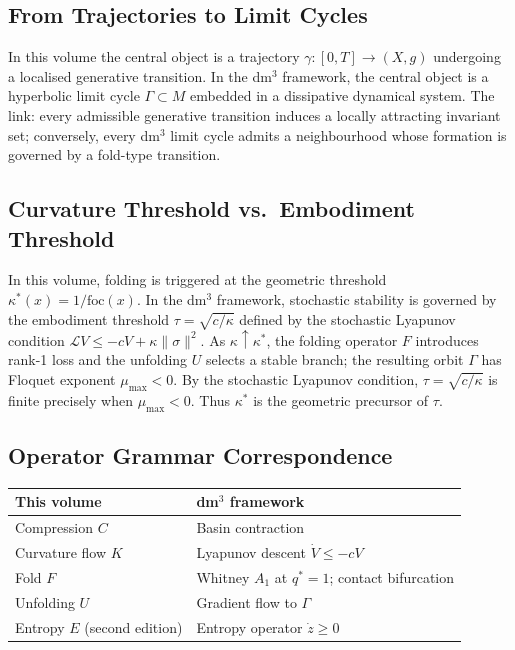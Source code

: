 \documentclass[12pt,a4paper]{article}
\begin{document}
\subsection{From Trajectories to Limit Cycles}

In this volume the central object is a trajectory
$\gamma : [0,T] \to (X,g)$ undergoing a localised generative
transition.
In the dm$^3$ framework, the central object is a hyperbolic limit cycle
$\Gamma \subset M$ embedded in a dissipative dynamical system.
The link: every admissible generative transition induces a locally
attracting invariant set; conversely, every dm$^3$ limit cycle admits
a neighbourhood whose formation is governed by a fold-type transition.

\subsection{Curvature Threshold vs.\ Embodiment Threshold}

In this volume, folding is triggered at the geometric threshold
$\kappa^*(x) = 1/\mathrm{foc}(x)$.
In the dm$^3$ framework, stochastic stability is governed by the
embodiment threshold $\tau = \sqrt{c/\kappa}$ defined by the stochastic
Lyapunov condition $\mathcal{L}V \leq -cV + \kappa\|\sigma\|^2$.
As $\kappa \uparrow \kappa^*$, the folding operator $F$ introduces
rank-1 loss and the unfolding $U$ selects a stable branch; the
resulting orbit $\Gamma$ has Floquet exponent $\mu_{\max} < 0$.
By the stochastic Lyapunov condition, $\tau = \sqrt{c/\kappa}$ is
finite precisely when $\mu_{\max} < 0$.
Thus $\kappa^*$ is the geometric precursor of $\tau$.

\subsection{Operator Grammar Correspondence}

\begin{center}
\small
\begin{tabular}{ll}
\toprule
This volume & dm$^3$ framework \\
\midrule
Compression $C$ & Basin contraction \\
Curvature flow $K$ & Lyapunov descent $\dot{V} \leq -cV$ \\
Fold $F$ & Whitney $A_1$ at $q^* = 1$; contact bifurcation \\
Unfolding $U$ & Gradient flow to $\Gamma$ \\
Entropy $E$ (second edition) & Entropy operator $\dot{z} \geq 0$ \\
\bottomrule
\end{tabular}
\end{center}
\end{document}
